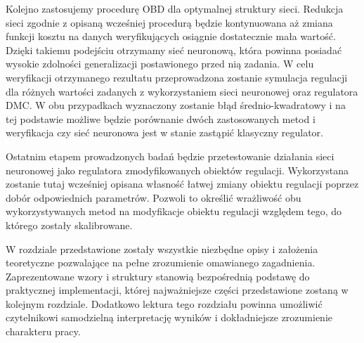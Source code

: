 \par Kolejno zastosujemy procedurę OBD dla optymalnej struktury sieci. Redukcja sieci zgodnie z opisaną wcześniej procedurą będzie kontynuowana aż zmiana funkcji kosztu na danych weryfikujących osiągnie dostatecznie mała wartość. Dzięki takiemu podejściu otrzymamy sieć neuronową, która powinna posiadać wysokie zdolności generalizacji postawionego przed nią zadania. W celu weryfikacji otrzymanego rezultatu przeprowadzona zostanie symulacja regulacji dla różnych wartości zadanych z wykorzystaniem sieci neuronowej oraz regulatora DMC. W obu przypadkach wyznaczony zostanie błąd średnio-kwadratowy i na tej podstawie możliwe będzie porównanie dwóch zastosowanych metod i weryfikacja czy sieć neuronowa jest w stanie zastąpić klasyczny regulator.
\par Ostatnim etapem prowadzonych badań będzie przetestowanie działania sieci neuronowej jako regulatora zmodyfikowanych obiektów regulacji. Wykorzystana zostanie tutaj wcześniej opisana własność łatwej zmiany obiektu regulacji poprzez dobór odpowiednich parametrów. Pozwoli to określić wrażliwość obu wykorzystywanych metod na modyfikacje obiektu regulacji względem tego, do którego zostały skalibrowane.
\par W rozdziale przedstawione zostały wszystkie niezbędne opisy i założenia teoretyczne pozwalające na pełne zrozumienie omawianego zagadnienia. Zaprezentowane wzory i struktury stanowią bezpośrednią podstawę do praktycznej implementacji, której najważniejsze części przedstawione zostaną w kolejnym rozdziale. Dodatkowo lektura tego rozdziału powinna umożliwić czytelnikowi samodzielną interpretację wyników i dokładniejsze zrozumienie charakteru pracy.  
      


